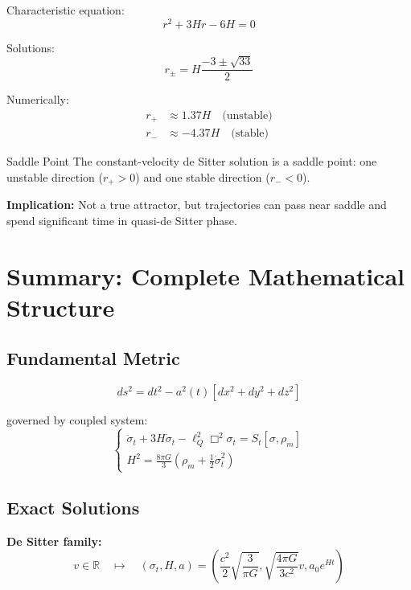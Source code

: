 \documentclass[11pt,a4paper]{article}
\theoremstyle{definition}
\theoremstyle{remark}
\begin{document}
	Characteristic equation:
	\begin{equation}
		r^2 + 3Hr - 6H = 0
	\end{equation}
	
	Solutions:
	\begin{equation}
		r_{\pm} = H\frac{-3 \pm \sqrt{33}}{2}
	\end{equation}
	
	Numerically:
	\begin{align}
		r_+ &\approx 1.37H \quad \text{(unstable)}\\
		r_- &\approx -4.37H \quad \text{(stable)}
	\end{align}
	
	Saddle Point
		The constant-velocity de Sitter solution is a saddle point: one unstable direction ($r_+ > 0$) and one stable direction ($r_- < 0$).
	
	\textbf{Implication:} Not a true attractor, but trajectories can pass near saddle and spend significant time in quasi-de Sitter phase.
	
	\section{Summary: Complete Mathematical Structure}
	
	\subsection{Fundamental Metric}
	
	\begin{equation}
		\boxed{ds^2 = dt^2 - a^2(t)[dx^2 + dy^2 + dz^2]}
	\end{equation}
	
	governed by coupled system:
	\begin{equation}
		\boxed{
			\begin{cases}
				\ddot{\sigma}_t + 3H\dot{\sigma}_t - \ell_Q^2\Box^2\sigma_t = S_t[\sigma, \rho_m]\\
				H^2 = \frac{8\pi G}{3}\left(\rho_m + \frac{1}{2}\dot{\sigma}_t^2\right)
			\end{cases}
		}
	\end{equation}
	
	\subsection{Exact Solutions}
	
	\textbf{De Sitter family:}
	\begin{equation}
		v \in \mathbb{R} \quad \mapsto \quad (\sigma_t, H, a) = \left(\frac{c^2}{2}\sqrt{\frac{3}{\pi G}}, \sqrt{\frac{4\pi G}{3c^2}}v, a_0 e^{Ht}\right)
	\end{equation}
	
\end{document}
